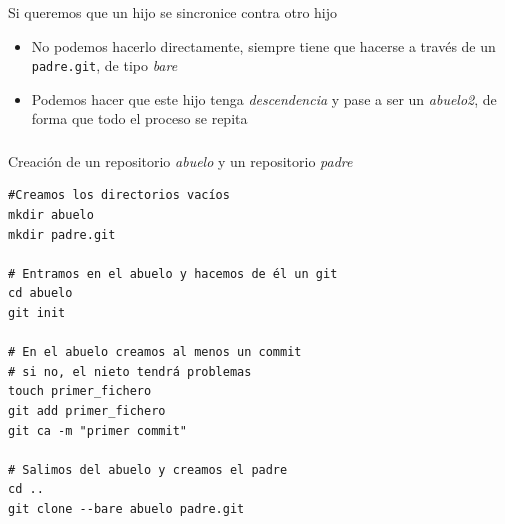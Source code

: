 \documentclass[ucs]{beamer}
\begin{document}
\begin{frame}[fragile]
\frametitle{}
Si queremos que un hijo se sincronice contra otro hijo
\begin{itemize}
\item
No podemos hacerlo 
directamente, siempre tiene que hacerse
a través de un 
\verb|padre.git|, de tipo \emph{bare}
\item
	Podemos hacer que este hijo tenga \emph{descendencia}
	y pase a ser un 
        \emph{abuelo2}, de forma que todo el proceso se repita

\end{itemize}

\end{frame}
\begin{frame}[fragile]
\frametitle{}
Creación de un repositorio \emph{abuelo} y un repositorio \emph{padre}

  \begin{scriptsize}
  \begin{verbatim}
#Creamos los directorios vacíos
mkdir abuelo
mkdir padre.git

# Entramos en el abuelo y hacemos de él un git
cd abuelo
git init

# En el abuelo creamos al menos un commit
# si no, el nieto tendrá problemas
touch primer_fichero  
git add primer_fichero
git ca -m "primer commit"

# Salimos del abuelo y creamos el padre
cd ..
git clone --bare abuelo padre.git
  \end{verbatim}
  \end{scriptsize}

\end{frame}
\end{document}
